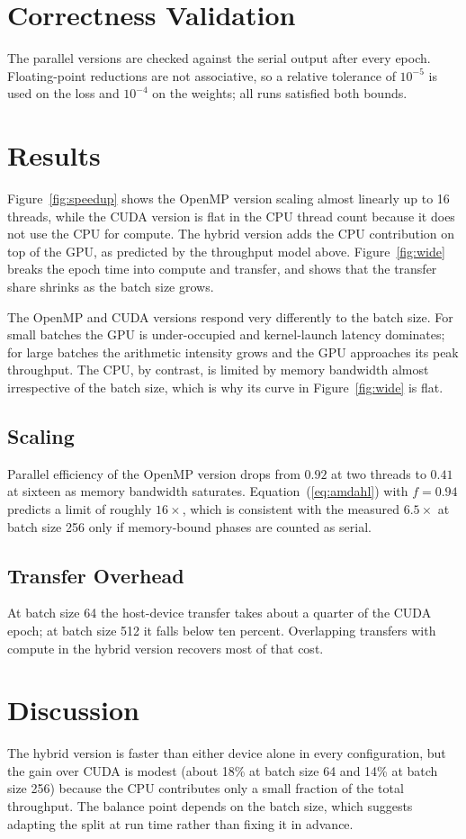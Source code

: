 \documentclass[siunitx]{cs259}
\begin{document}
\section{Correctness Validation}
The parallel versions are checked against the serial output after every
epoch. Floating-point reductions are not associative, so a relative tolerance
of $10^{-5}$ is used on the loss and $10^{-4}$ on the weights; all runs
satisfied both bounds.


\section{Results}\label{sec:results}
Figure~\ref{fig:speedup} shows the OpenMP version scaling almost linearly up
to 16 threads, while the CUDA version is flat in the CPU thread count because
it does not use the CPU for compute. The hybrid version adds the CPU
contribution on top of the GPU, as predicted by the throughput model above.
Figure~\ref{fig:wide} breaks the epoch time into compute and transfer, and
shows that the transfer share shrinks as the batch size grows.


The OpenMP and CUDA versions respond very differently to the batch size. For
small batches the GPU is under-occupied and kernel-launch latency dominates;
for large batches the arithmetic intensity grows and the GPU approaches its
peak throughput. The CPU, by contrast, is limited by memory bandwidth almost
irrespective of the batch size, which is why its curve in
Figure~\ref{fig:wide} is flat.

\subsection{Scaling}
Parallel efficiency of the OpenMP version drops from $0.92$ at two threads to
$0.41$ at sixteen as memory bandwidth saturates. Equation~(\ref{eq:amdahl})
with $f=0.94$ predicts a limit of roughly $16\times$, which is consistent with
the measured $6.5\times$ at batch size 256 only if memory-bound phases are
counted as serial.

\subsection{Transfer Overhead}
At batch size 64 the host-device transfer takes about a quarter of the CUDA
epoch; at batch size 512 it falls below ten percent. Overlapping transfers
with compute in the hybrid version recovers most of that cost.

\section{Discussion}
The hybrid version is faster than either device alone in every configuration,
but the gain over CUDA is modest (about 18\% at batch size 64 and 14\% at
batch size 256) because the CPU contributes only a small fraction of the
total throughput. The balance point depends on the batch size, which suggests
adapting the split at run time rather than fixing it in advance.
\end{document}
